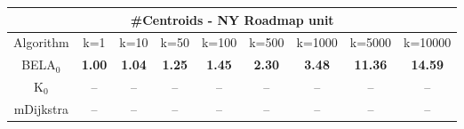 \begin{tabular}{c|cccccccc}\toprule
\multicolumn{9}{c}{#Centroids - NY Roadmap unit}\\ \midrule
Algorithm & k=1 & k=10 & k=50 & k=100 & k=500 & k=1000 & k=5000 & k=10000 \\ \midrule
BELA$_0$ & \textbf{1.00} & \textbf{1.04} & \textbf{1.25} & \textbf{1.45} & \textbf{2.30} & \textbf{3.48} & \textbf{11.36} & \textbf{14.59} \\
K$_0$ & -- & -- & -- & -- & -- & -- & -- & -- \\
mDijkstra & -- & -- & -- & -- & -- & -- & -- & -- \\ \bottomrule 
\end{tabular}
